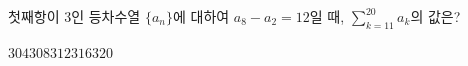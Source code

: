 첫째항이 $3$인 등차수열 $\{a_n\}$에 대하여 $a_8-a_2=12$일 때, $\displaystyle\sum_{k=11}^{20} a_k$의 값은?
\begin{choices32}{$304$}{$308$}{$312$}{$316$}{$320$}\end{choices32}
